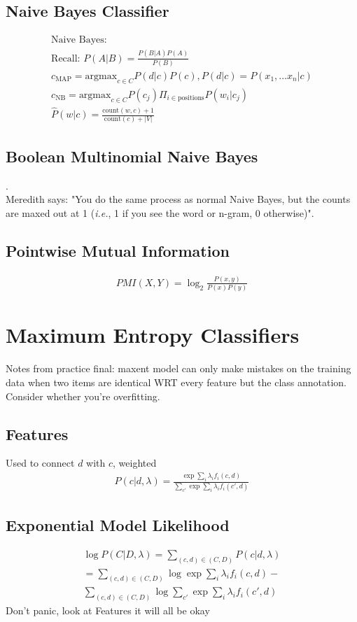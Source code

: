 \documentclass[10pt,twocolumn]{amsart}
\begin{document}
\subsection{Naive Bayes Classifier}
\begin{gather*}
\text{Naive Bayes: } \\
\text{Recall: } P(A|B) = \frac{P(B|A)P(A)}{P(B)}\\
c_{\text{MAP}} = \text{argmax}_{c \in C} P(d|c)P(c), P(d|c) = P(x_1, ...x_{n}|c)\\
c_{\text{NB}} = \text{argmax}_{c \in C} P(c_{j}) \Pi_{i \in \text{positions}} 
                                                 P(w_{i}|c_{j}) \\
\hat{P}(w|c)= \frac{\text{count}(w,c)+1}{\text{count}(c)+|V|}
\end{gather*}
\subsection{Boolean Multinomial Naive Bayes} .\\
Meredith says: "You do the same process as normal Naive Bayes, but the
 counts are maxed out at 1 (\emph{i.e.}, 1 if you see the word or n-gram,
 0 otherwise)".
\subsection{Pointwise Mutual Information}
\begin{gather*}
PMI(X,Y) = \log_{2} \frac{P(x,y)}{P(x)P(y)}
\end{gather*}
\section{Maximum Entropy Classifiers}
Notes from practice final: maxent model can only make mistakes on the training
data when two items are identical WRT every feature but the class annotation.
Consider whether you're overfitting.
\subsection{Features} Used to connect $d$ with $c$, weighted
\begin{gather*}
P(c|d, \lambda) = \frac{\exp \sum_{i} \lambda_{i} f_{i}(c,d)}
                       {\sum_{c'} \exp \sum_{i}\lambda_{i}f_{i}(c',d)}
\end{gather*}
\subsection{Exponential Model Likelihood}
\begin{gather*}
\log P(C|D, \lambda) = 
          \sum_{\left(c,d\right)\in\left(C,D\right)} P(c|d, \lambda) \\
 = \sum_{\left(c,d\right)\in\left(C,D\right)} \log \exp \sum_{i} \lambda_{i}
                                               f_{i}\left(c,d\right) -  \\
    \sum_{\left(c,d\right)\in\left(C,D\right)} \log \sum_{c'} \exp \sum_{i}
                                        \lambda_{i}f_{i}\left(c',d\right)
\end{gather*}
Don't panic, look at Features it will all be okay
\end{document}
